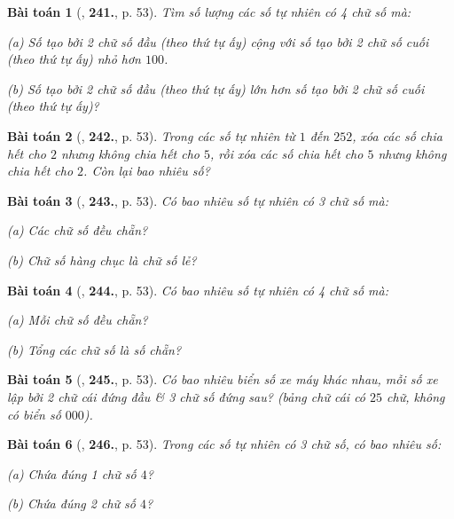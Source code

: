 \documentclass{article}
\numberwithin{equation}{section}
\newtheorem{baitoan}{Bài toán}[section]
\begin{document}
\begin{baitoan}[\cite{Binh_Toan_6_tap_1}, \textbf{241.}, p. 53]
	Tìm số lượng các số tự nhiên có 4 chữ số mà:
	\begin{enumerate*}
		\item[(a)] Số tạo bởi 2 chữ số đầu (theo thứ tự ấy) cộng với số tạo bởi 2 chữ số cuối (theo thứ tự ấy) nhỏ hơn $100$.
		\item[(b)] Số tạo bởi 2 chữ số đầu (theo thứ tự ấy) lớn hơn số tạo bởi 2 chữ số cuối (theo thứ tự ấy)?
	\end{enumerate*}
\end{baitoan}

\begin{baitoan}[\cite{Binh_Toan_6_tap_1}, \textbf{242.}, p. 53]
	Trong các số tự nhiên từ $1$ đến $252$, xóa các số chia hết cho $2$ nhưng không chia hết cho $5$, rồi xóa các số chia hết cho $5$ nhưng không chia hết cho $2$. Còn lại bao nhiêu số?
\end{baitoan}

\begin{baitoan}[\cite{Binh_Toan_6_tap_1}, \textbf{243.}, p. 53]
	Có bao nhiêu số tự nhiên có 3 chữ số mà:
	\begin{enumerate*}
		\item[(a)] Các chữ số đều chẵn?
		\item[(b)] Chữ số hàng chục là chữ số lẻ?
	\end{enumerate*}
\end{baitoan}

\begin{baitoan}[\cite{Binh_Toan_6_tap_1}, \textbf{244.}, p. 53]
	Có bao nhiêu số tự nhiên có 4 chữ số mà:
	\begin{enumerate*}
		\item[(a)] Mỗi chữ số đều chẵn?
		\item[(b)] Tổng các chữ số là số chẵn?
	\end{enumerate*}
\end{baitoan}

\begin{baitoan}[\cite{Binh_Toan_6_tap_1}, \textbf{245.}, p. 53]
	Có bao nhiêu biển số xe máy khác nhau, mỗi số xe lập bởi 2 chữ cái đứng đầu \& 3 chữ số đứng sau? (bảng chữ cái có $25$ chữ, không có biển số $000$).
\end{baitoan}

\begin{baitoan}[\cite{Binh_Toan_6_tap_1}, \textbf{246.}, p. 53]
	Trong các số tự nhiên có 3 chữ số, có bao nhiêu số:
	\begin{enumerate*}
		\item[(a)] Chứa đúng 1 chữ số $4$?
		\item[(b)] Chứa đúng 2 chữ số $4$?
	\end{enumerate*}
\end{baitoan}
\end{document}

